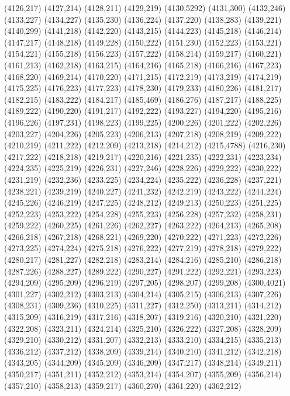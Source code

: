 (4126,217)
(4127,214)
(4128,211)
(4129,219)
(4130,5292)
(4131,300)
(4132,246)
(4133,227)
(4134,227)
(4135,230)
(4136,224)
(4137,220)
(4138,283)
(4139,221)
(4140,299)
(4141,218)
(4142,220)
(4143,215)
(4144,223)
(4145,218)
(4146,214)
(4147,217)
(4148,218)
(4149,228)
(4150,222)
(4151,230)
(4152,223)
(4153,221)
(4154,221)
(4155,218)
(4156,223)
(4157,222)
(4158,214)
(4159,217)
(4160,221)
(4161,213)
(4162,218)
(4163,215)
(4164,216)
(4165,218)
(4166,216)
(4167,223)
(4168,220)
(4169,214)
(4170,220)
(4171,215)
(4172,219)
(4173,219)
(4174,219)
(4175,225)
(4176,223)
(4177,223)
(4178,230)
(4179,233)
(4180,226)
(4181,217)
(4182,215)
(4183,222)
(4184,217)
(4185,469)
(4186,276)
(4187,217)
(4188,225)
(4189,222)
(4190,220)
(4191,217)
(4192,222)
(4193,227)
(4194,220)
(4195,216)
(4196,226)
(4197,231)
(4198,223)
(4199,225)
(4200,226)
(4201,222)
(4202,226)
(4203,227)
(4204,226)
(4205,223)
(4206,213)
(4207,218)
(4208,219)
(4209,222)
(4210,219)
(4211,222)
(4212,209)
(4213,218)
(4214,212)
(4215,4788)
(4216,230)
(4217,222)
(4218,218)
(4219,217)
(4220,216)
(4221,235)
(4222,231)
(4223,234)
(4224,235)
(4225,219)
(4226,231)
(4227,246)
(4228,226)
(4229,222)
(4230,222)
(4231,219)
(4232,236)
(4233,225)
(4234,224)
(4235,222)
(4236,228)
(4237,221)
(4238,221)
(4239,219)
(4240,227)
(4241,232)
(4242,219)
(4243,222)
(4244,224)
(4245,226)
(4246,219)
(4247,225)
(4248,212)
(4249,213)
(4250,223)
(4251,225)
(4252,223)
(4253,222)
(4254,228)
(4255,223)
(4256,228)
(4257,232)
(4258,231)
(4259,222)
(4260,225)
(4261,226)
(4262,227)
(4263,222)
(4264,213)
(4265,208)
(4266,218)
(4267,218)
(4268,221)
(4269,220)
(4270,222)
(4271,223)
(4272,226)
(4273,225)
(4274,224)
(4275,218)
(4276,222)
(4277,219)
(4278,218)
(4279,222)
(4280,217)
(4281,227)
(4282,218)
(4283,214)
(4284,216)
(4285,210)
(4286,218)
(4287,226)
(4288,227)
(4289,222)
(4290,227)
(4291,222)
(4292,221)
(4293,223)
(4294,209)
(4295,209)
(4296,219)
(4297,205)
(4298,207)
(4299,208)
(4300,4021)
(4301,227)
(4302,212)
(4303,213)
(4304,214)
(4305,215)
(4306,213)
(4307,226)
(4308,231)
(4309,236)
(4310,225)
(4311,227)
(4312,250)
(4313,211)
(4314,212)
(4315,209)
(4316,219)
(4317,216)
(4318,207)
(4319,216)
(4320,210)
(4321,220)
(4322,208)
(4323,211)
(4324,214)
(4325,210)
(4326,222)
(4327,208)
(4328,209)
(4329,210)
(4330,212)
(4331,207)
(4332,213)
(4333,210)
(4334,215)
(4335,213)
(4336,212)
(4337,212)
(4338,209)
(4339,214)
(4340,210)
(4341,212)
(4342,218)
(4343,205)
(4344,209)
(4345,209)
(4346,209)
(4347,217)
(4348,214)
(4349,211)
(4350,217)
(4351,211)
(4352,212)
(4353,214)
(4354,207)
(4355,209)
(4356,214)
(4357,210)
(4358,213)
(4359,217)
(4360,270)
(4361,220)
(4362,212)
